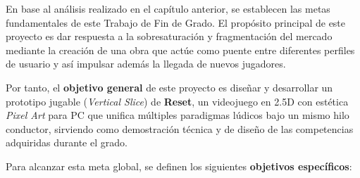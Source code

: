 En base al análisis realizado en el capítulo anterior, se establecen las metas fundamentales de este Trabajo de Fin de Grado. El propósito principal de este proyecto es dar respuesta a la sobresaturación y fragmentación del mercado mediante la creación de una obra que actúe como puente entre diferentes perfiles de usuario y así impulsar además la llegada de nuevos jugadores. 

Por tanto, el \textbf{objetivo general} de este proyecto es diseñar y desarrollar un prototipo jugable (\textit{Vertical Slice}) de \textbf{Reset}, un videojuego en 2.5D con estética \textit{Pixel Art} para PC que unifica múltiples paradigmas lúdicos bajo un mismo hilo conductor, sirviendo como demostración técnica y de diseño de las competencias adquiridas durante el grado.

Para alcanzar esta meta global, se definen los siguientes \textbf{objetivos específicos}:


